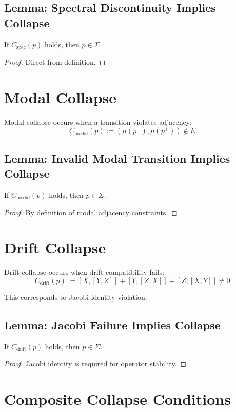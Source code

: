 \documentclass[11pt]{article}
\begin{document}
\subsection{Lemma: Spectral Discontinuity Implies Collapse}
If $C_{\mathrm{spec}}(p)$ holds, then $p \in \Sigma$.

\begin{proof}
Direct from definition.
\end{proof}

\section{Modal Collapse}

Modal collapse occurs when a transition violates adjacency:
\[
C_{\mathrm{modal}}(p)
  := (\mu(p^-), \mu(p^+)) \notin E.
\]

\subsection{Lemma: Invalid Modal Transition Implies Collapse}
If $C_{\mathrm{modal}}(p)$ holds, then $p \in \Sigma$.

\begin{proof}
By definition of modal adjacency constraints.
\end{proof}

\section{Drift Collapse}

Drift collapse occurs when drift compatibility fails:
\[
C_{\mathrm{drift}}(p)
  := [X,[Y,Z]] + [Y,[Z,X]] + [Z,[X,Y]] \neq 0.
\]

This corresponds to Jacobi identity violation.

\subsection{Lemma: Jacobi Failure Implies Collapse}
If $C_{\mathrm{drift}}(p)$ holds, then $p \in \Sigma$.

\begin{proof}
Jacobi identity is required for operator stability.
\end{proof}

\section{Composite Collapse Conditions}
\end{document}
